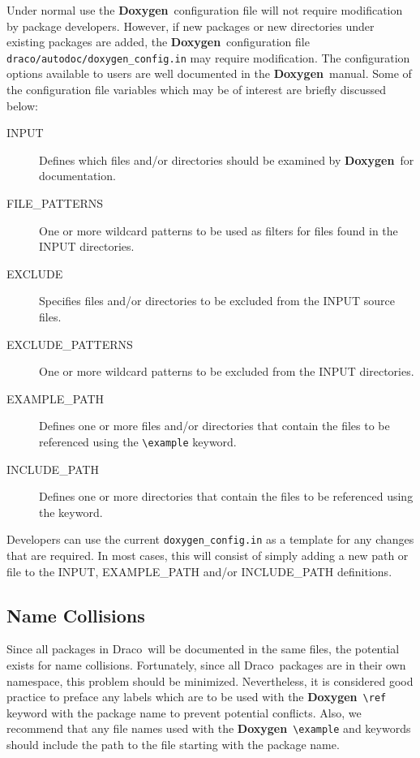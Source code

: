 \documentclass[11pt]{nmemo}
\newcommand{\draco}{{\normalfont\sffamily Draco}}
\newcommand{\doxy}{{\normalfont\bfseries Doxygen}}
\begin{document}
Under normal use the \doxy\ configuration file will not require
modification by package developers. However, if new packages or
new directories under existing packages are added,
the \doxy\ configuration file \texttt{draco/autodoc/doxygen\_config.in}
may require modification.
The configuration options available to users are well
documented in the \doxy\ manual. Some of the configuration file 
variables which may be of interest are briefly discussed below:
\begin{description}
\item[\ttfamily INPUT] Defines which files and/or
  directories should be  examined by \doxy\ for documentation.  
\item [\ttfamily FILE\_PATTERNS] One or more wildcard patterns to be
  used as filters for files found in the INPUT directories. 
\item [\ttfamily EXCLUDE] Specifies files and/or directories to be
   excluded from the INPUT source files.
\item [\ttfamily EXCLUDE\_PATTERNS] One or more wildcard patterns to be
  excluded from the INPUT directories.
\item [\ttfamily EXAMPLE\_PATH] Defines one or more files and/or
  directories that contain the files to be referenced using
  the \verb+\example+ keyword.
\item [\ttfamily INCLUDE\_PATH] Defines one or more 
  directories that contain the files to be referenced using the
 \verb++ keyword.
\end{description}

Developers can use the current \texttt{doxygen\_config.in} as a template for
any changes that are required. In most cases, this will consist of
simply adding a new path or file to the INPUT, EXAMPLE\_PATH and/or 
INCLUDE\_PATH definitions.

\subsection{Name Collisions}
Since all packages in \draco\ will be documented in the same
files, the potential exists for name collisions. Fortunately,
since all \draco\ packages are in their own namespace, this problem
should be minimized. Nevertheless, 
    it is considered good practice  to preface any labels which are to be
used with the \doxy\ \verb+\ref+ keyword with the
    package name to prevent potential conflicts.
Also, we recommend that any file names used
with the \doxy\ \verb+\example+ and \verb++ keywords
should include the path to the file starting with the package name.
\end{document}
